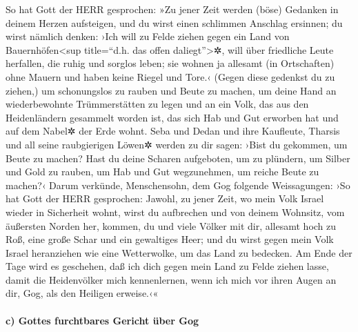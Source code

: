 So hat Gott der HERR gesprochen: »Zu jener Zeit werden
(böse) Gedanken in deinem Herzen aufsteigen, und du wirst einen
schlimmen Anschlag ersinnen; du wirst nämlich denken:
›Ich will zu Felde ziehen gegen ein Land von Bauernhöfen\textless sup
title=``d.h. das offen daliegt''\textgreater✲, will über friedliche
Leute herfallen, die ruhig und sorglos leben; sie wohnen ja allesamt (in
Ortschaften) ohne Mauern und haben keine Riegel und Tore.‹
(Gegen diese gedenkst du zu ziehen,) um schonungslos zu
rauben und Beute zu machen, um deine Hand an wiederbewohnte
Trümmerstätten zu legen und an ein Volk, das aus den Heidenländern
gesammelt worden ist, das sich Hab und Gut erworben hat und auf dem
Nabel✲ der Erde wohnt. Seba und Dedan und ihre Kaufleute,
Tharsis und all seine raubgierigen Löwen✲ werden zu dir sagen: ›Bist du
gekommen, um Beute zu machen? Hast du deine Scharen aufgeboten, um zu
plündern, um Silber und Gold zu rauben, um Hab und Gut wegzunehmen, um
reiche Beute zu machen?‹ Darum verkünde, Menschensohn,
dem Gog folgende Weissagungen: ›So hat Gott der HERR gesprochen: Jawohl,
zu jener Zeit, wo mein Volk Israel wieder in Sicherheit wohnt, wirst du
aufbrechen und von deinem Wohnsitz, vom äußersten Norden
her, kommen, du und viele Völker mit dir, allesamt hoch zu Roß, eine
große Schar und ein gewaltiges Heer; und du wirst gegen
mein Volk Israel heranziehen wie eine Wetterwolke, um das Land zu
bedecken. Am Ende der Tage wird es geschehen, daß ich dich gegen mein
Land zu Felde ziehen lasse, damit die Heidenvölker mich kennenlernen,
wenn ich mich vor ihren Augen an dir, Gog, als den Heiligen erweise.‹«

\hypertarget{c-gottes-furchtbares-gericht-uxfcber-gog}{%
\paragraph{c) Gottes furchtbares Gericht über
Gog}\label{c-gottes-furchtbares-gericht-uxfcber-gog}}


